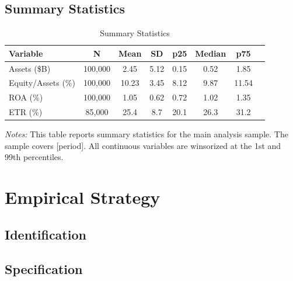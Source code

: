 \documentclass[12pt]{article}
\begin{document}
\subsection{Summary Statistics}

\begin{table}[htbp]
\centering
\begin{threeparttable}
\caption{Summary Statistics}
\label{tab:sumstats}
\begin{tabular}{lccccccc}
\toprule
Variable & N & Mean & SD & p25 & Median & p75 \\
\midrule
Assets (\$B)      & 100,000 & 2.45  & 5.12  & 0.15  & 0.52  & 1.85  \\
Equity/Assets (\%) & 100,000 & 10.23 & 3.45  & 8.12  & 9.87  & 11.54 \\
ROA (\%)           & 100,000 & 1.05  & 0.62  & 0.72  & 1.02  & 1.35  \\
ETR (\%)           & 85,000  & 25.4  & 8.7   & 20.1  & 26.3  & 31.2  \\
\bottomrule
\end{tabular}
\begin{tablenotes}[flushleft]
\small
\item \textit{Notes:} This table reports summary statistics for the main
analysis sample. The sample covers [period]. All continuous variables are
winsorized at the 1st and 99th percentiles.
\end{tablenotes}
\end{threeparttable}
\end{table}


\section{Empirical Strategy}

\subsection{Identification}

\subsection{Specification}
\end{document}
